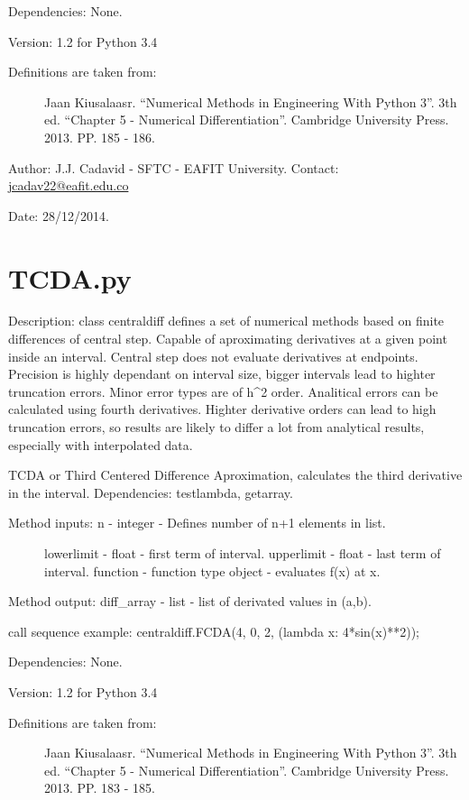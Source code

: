 \documentclass[letterpaper,10pt,oneside]{sphinxmanual}
\theoremstyle{plain}%
\theoremstyle{definition}%
\theoremstyle{remark}%
\begin{document}
Dependencies: None.

Version: 1.2 for Python 3.4
\begin{description}
\item[{Definitions are taken from:}] \leavevmode
Jaan Kiusalaasr. ``Numerical Methods in Engineering With Python 3''.
3th ed. ``Chapter 5 - Numerical Differentiation''. 
Cambridge University Press. 2013. PP. 185 - 186.

\end{description}

Author: J.J. Cadavid - SFTC - EAFIT University.
Contact: \href{mailto:jcadav22@eafit.edu.co}{jcadav22@eafit.edu.co}

Date: 28/12/2014.


\section{TCDA.py}
\label{code:tcda-py}\label{code:module-TCDA}
Description: class centraldiff defines a set of numerical methods based on
finite differences of central step. Capable of aproximating derivatives at
a given point inside an interval. Central step does not evaluate derivatives
at endpoints. Precision is highly dependant on interval size, bigger intervals
lead to highter truncation errors. Minor error types are of h\textasciicircum{}2 order.
Analitical errors can be calculated using fourth derivatives. Highter
derivative orders can lead to high truncation errors, so results are likely
to differ a lot from analytical results, especially with interpolated data.

TCDA or Third Centered Difference Aproximation, calculates the third
derivative in the interval. Dependencies: testlambda, getarray.
\begin{description}
\item[{Method inputs: n - integer - Defines number of n+1 elements in list.}] \leavevmode
lowerlimit - float - first term of interval.
upperlimit - float - last term of interval.
function - function type object - evaluates f(x) at x.

\end{description}

Method output: diff\_array - list - list of derivated values in (a,b).

call sequence example: centraldiff.FCDA(4, 0, 2, (lambda x: 4*sin(x)**2));

Dependencies: None.

Version: 1.2 for Python 3.4
\begin{description}
\item[{Definitions are taken from:}] \leavevmode
Jaan Kiusalaasr. ``Numerical Methods in Engineering With Python 3''.
3th ed. ``Chapter 5 - Numerical Differentiation''. 
Cambridge University Press. 2013. PP. 183 - 185.

\end{description}
\end{document}
